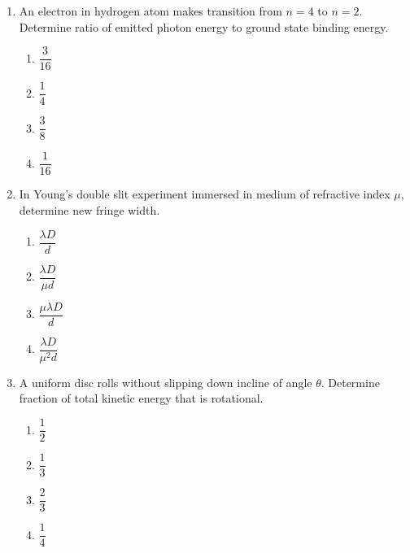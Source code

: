 \documentclass[12pt]{article}
\begin{document}
\begin{enumerate}
\begin{center}
\end{center}

\begin{enumerate}
\item $\sqrt{\dfrac{k}{m}}$
\item $\sqrt{\dfrac{k}{m}+\dfrac{a}{l}}$
\item $\sqrt{\dfrac{k}{m}-\dfrac{a}{l}}$
\item Depends on $a$
\end{enumerate}

\item An electron in hydrogen atom makes transition from $n=4$ to $n=2$. Determine ratio of emitted photon energy to ground state binding energy.

\begin{enumerate}
\item $\dfrac{3}{16}$
\item $\dfrac{1}{4}$
\item $\dfrac{3}{8}$
\item $\dfrac{1}{16}$
\end{enumerate}

\item In Young's double slit experiment immersed in medium of refractive index $\mu$, determine new fringe width.

\begin{enumerate}
\item $\dfrac{\lambda D}{d}$
\item $\dfrac{\lambda D}{\mu d}$
\item $\dfrac{\mu\lambda D}{d}$
\item $\dfrac{\lambda D}{\mu^2 d}$
\end{enumerate}

\item A uniform disc rolls without slipping down incline of angle $\theta$. Determine fraction of total kinetic energy that is rotational.

\begin{enumerate}
\item $\dfrac{1}{2}$
\item $\dfrac{1}{3}$
\item $\dfrac{2}{3}$
\item $\dfrac{1}{4}$
\end{enumerate}


\end{enumerate}
\end{document}

